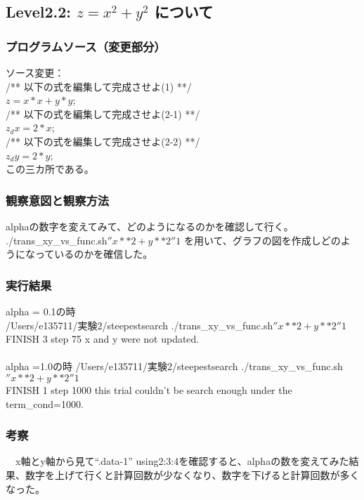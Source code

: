 \subsection{Level2.2: $z=x^2 + y^2$ について}
\subsubsection{プログラムソース（変更部分）}
ソース変更：\\
/** 以下の式を編集して完成させよ(1) **/\\
 $ z = x*x + y*y$;\\
/** 以下の式を編集して完成させよ(2-1) **/\\
$z_dx = 2*x$;\\
/** 以下の式を編集して完成させよ(2-2) **/\\
$z_dy = 2*y$;\\
この三カ所である。\\
\subsubsection{観察意図と観察方法}
alphaの数字を変えてみて、どのようになるのかを確認して行く。\\
./trans_xy_vs_func.sh$ ''x**2+y**2'' 1$ を用いて、グラフの図を作成しどのようになっているのかを確信した。\\
\subsubsection{実行結果}
alpha = 0.1の時\\
/Users/e135711/実験2/steepestsearch ./trans_xy_vs_func.sh$ ''x**2+y**2'' 1$\\
FINISH 3 step 75 x and y were not updated.\\
\\
alpha =1.0の時
/Users/e135711/実験2/steepestsearch ./trans_xy_vs_func.sh $''x**2+y**2'' 1$\\
FINISH 1 step 1000 this trial couldn't be search enough under the term_cond=1000.\\
\subsubsection{考察}
　x軸とy軸から見て“.data-1” using2:3:4を確認すると、alphaの数を変えてみた結果、数字を上げて行くと計算回数が少なくなり、数字を下げると計算回数が多くなった。\\
